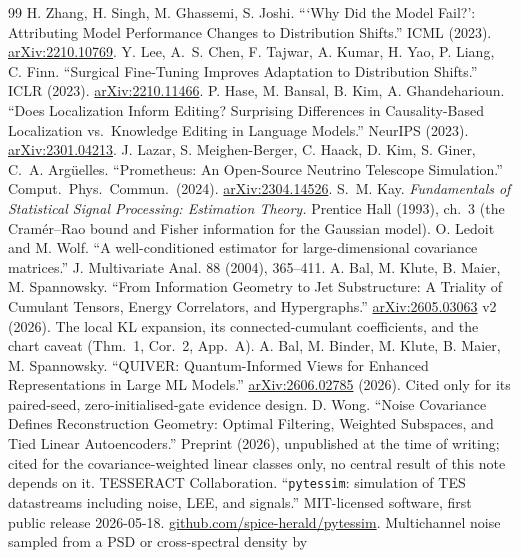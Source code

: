 \documentclass[10pt,twocolumn]{extarticle}
\begin{document}
\begin{thebibliography}{99}
 H. Zhang, H. Singh, M. Ghassemi, S. Joshi. ```Why Did the
Model Fail?': Attributing Model Performance Changes to Distribution Shifts.''
ICML (2023). \href{https://arxiv.org/abs/2210.10769}{arXiv:2210.10769}.
 Y. Lee, A.~S. Chen, F. Tajwar, A. Kumar, H. Yao,
P. Liang, C. Finn. ``Surgical Fine-Tuning Improves Adaptation to Distribution
Shifts.'' ICLR (2023).
\href{https://arxiv.org/abs/2210.11466}{arXiv:2210.11466}.
 P. Hase, M. Bansal, B. Kim, A. Ghandeharioun. ``Does
Localization Inform Editing? Surprising Differences in Causality-Based
Localization vs.\ Knowledge Editing in Language Models.'' NeurIPS (2023).
\href{https://arxiv.org/abs/2301.04213}{arXiv:2301.04213}.
 J. Lazar, S. Meighen-Berger, C. Haack, D. Kim,
S. Giner, C.~A. Arg\"uelles. ``Prometheus: An Open-Source Neutrino Telescope
Simulation.'' Comput.\ Phys.\ Commun.\ (2024).
\href{https://arxiv.org/abs/2304.14526}{arXiv:2304.14526}.
 S.~M. Kay. \emph{Fundamentals of Statistical Signal
Processing: Estimation Theory.} Prentice Hall (1993), ch.~3 (the Cram\'er--Rao
bound and Fisher information for the Gaussian model).
 O. Ledoit and M. Wolf. ``A well-conditioned estimator
for large-dimensional covariance matrices.'' J. Multivariate Anal. 88 (2004),
365--411.
 A. Bal, M. Klute, B. Maier, M. Spannowsky. ``From
Information Geometry to Jet Substructure: A Triality of Cumulant Tensors, Energy
Correlators, and Hypergraphs.'' \href{https://arxiv.org/abs/2605.03063}{arXiv:2605.03063}
v2 (2026). The local KL expansion, its connected-cumulant coefficients, and the
chart caveat (Thm.~1, Cor.~2, App.~A).
 A. Bal, M. Binder, M. Klute, B. Maier, M. Spannowsky.
``QUIVER: Quantum-Informed Views for Enhanced Representations in Large ML
Models.'' \href{https://arxiv.org/abs/2606.02785}{arXiv:2606.02785} (2026).
Cited only for its paired-seed, zero-initialised-gate evidence design.
 D. Wong. ``Noise Covariance Defines Reconstruction
Geometry: Optimal Filtering, Weighted Subspaces, and Tied Linear
Autoencoders.'' Preprint (2026), unpublished at the time of writing; cited for
the covariance-weighted linear classes only, no central result of this note
depends on it.
 TESSERACT Collaboration. ``\texttt{pytessim}: simulation of
TES datastreams including noise, LEE, and signals.'' MIT-licensed software,
first public release 2026-05-18.
\href{https://github.com/spice-herald/pytessim}{github.com/spice-herald/pytessim}.
Multichannel noise sampled from a PSD or cross-spectral density by

\end{thebibliography}
\end{document}
